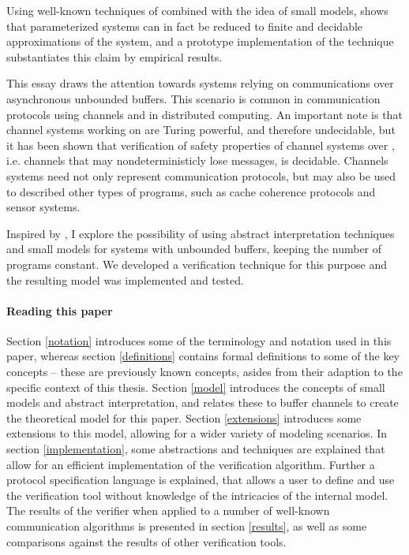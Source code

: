 Using well-known techniques of  combined with the idea of small models, \cite{parosh} shows that parameterized systems can in fact be reduced to finite and decidable approximations of the system, and a prototype implementation of the technique substantiates this claim by empirical results.

This essay draws the attention towards systems relying on communications over asynchronous unbounded buffers. This scenario is common in communication protocols using channels and in distributed computing\cite{fredlund2007mcerlang}. An important note is that channel systems working on  are Turing powerful, and therefore undecidable, but it has been shown that verification of safety properties of channel systems over , i.e. channels that may nondeterministicly lose messages, is decidable\cite{287591}\cite{gordon}. Channels systems need not only represent communication protocols, but may also be used to described other types of programs, such as cache coherence protocols and sensor systems\cite{zuck2004}.

Inspired by \cite{parosh}, I explore the possibility of using abstract interpretation techniques and small models for systems with unbounded buffers, keeping the number of programs constant. We developed a verification technique for this purpose and the resulting model was implemented and tested. 



\paragraph{Reading this paper} Section \ref{notation} introduces some of the terminology and notation used in this paper, whereas section \ref{definitions} contains formal definitions to some of the key concepts -- these are previously known concepts, asides from their adaption to the specific context of this thesis. Section \ref{model} introduces the concepts of small models and abstract interpretation, and relates these to buffer channels to create the theoretical model for this paper. Section \ref{extensions} introduces some extensions to this model, allowing for a wider variety of modeling scenarios. In section \ref{implementation}, some abstractions and techniques are explained that allow for an efficient implementation of the verification algorithm. Further a protocol specification language is explained, that allows a user to define and use the verification tool without knowledge of the intricacies of the internal model. The results of the verifier when applied to a number of well-known communication algorithms is presented in section \ref{results}, as well as some comparisons against the results of other verification tools.

 	

